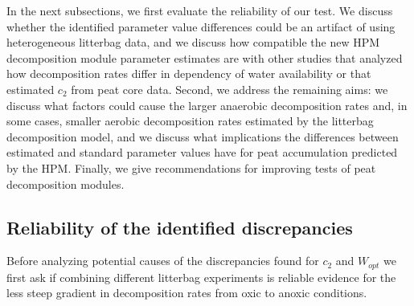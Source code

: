 \documentclass[esd, manuscript]{copernicus}
\begin{document}
In the next subsections, we first evaluate the reliability of our test. We discuss whether the identified parameter value differences could be an artifact of using heterogeneous litterbag data, and we discuss how compatible the new HPM decomposition module parameter estimates are with other studies that analyzed how decomposition rates differ in dependency of water availability or that estimated \(c_2\) from peat core data. Second, we address the remaining aims: we discuss what factors could cause the larger anaerobic decomposition rates and, in some cases, smaller aerobic decomposition rates estimated by the litterbag decomposition model, and we discuss what implications the differences between estimated and standard parameter values have for peat accumulation predicted by the HPM. Finally, we give recommendations for improving tests of peat decomposition modules.

\hypertarget{out-discussion-3}{%
\subsection{Reliability of the identified discrepancies}\label{out-discussion-3}}

Before analyzing potential causes of the discrepancies found for \(c_2\) and \(W_{opt}\) we first ask if combining different litterbag experiments is reliable evidence for the less steep gradient in decomposition rates from oxic to anoxic conditions.
\end{document}
